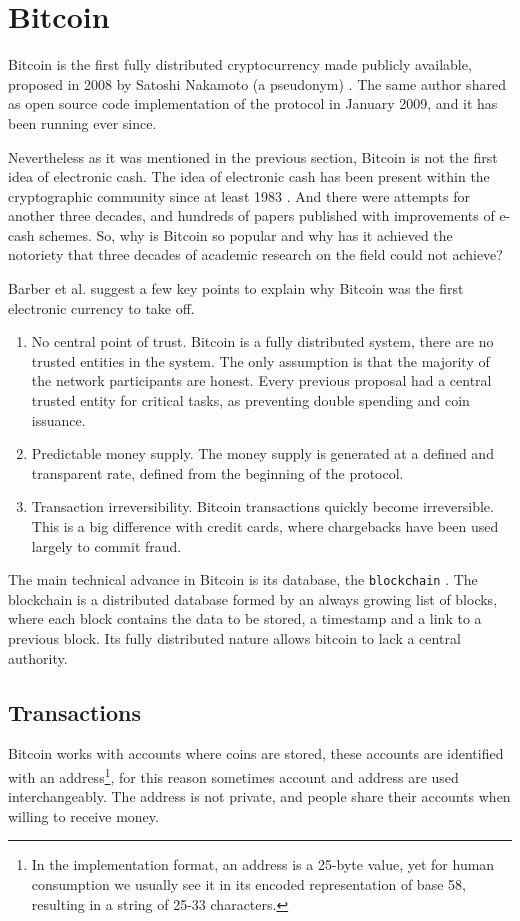 \section{Bitcoin}
Bitcoin is the first fully distributed cryptocurrency made publicly available,
  proposed in 2008 by Satoshi Nakamoto (a pseudonym) \cite{nakamoto2008bitcoin}.
The same author shared as open source code implementation of the protocol in
  January 2009, and it has been running ever since.

Nevertheless as it was mentioned in the previous section, Bitcoin is not the
  first idea of electronic cash.
The idea of electronic cash has been present within the cryptographic community
  since at least 1983 \cite{chaum1983blind}.
And there were attempts for another three decades, and hundreds of papers
  published with improvements of e-cash schemes\cite{barber2012bitter}.
So, why is Bitcoin so popular and why has it achieved the notoriety that three
  decades of academic research on the field could not achieve?

Barber et al. \cite{barber2012bitter} suggest a few key points to explain why
  Bitcoin was the first electronic currency to take off.
\begin{enumerate}
\item No central point of trust.
	Bitcoin is a fully distributed system, there are no trusted entities in the
	  system. The only assumption is that the majority of the network participants
	  are honest. Every previous proposal had a central trusted entity for
	  critical tasks, as preventing double spending and coin issuance.
\item Predictable money supply.
	The money supply is generated at a defined and transparent rate, defined from
	  the beginning of the protocol.
\item Transaction irreversibility.
	Bitcoin transactions quickly become irreversible. This is a big difference
	  with credit cards, where chargebacks have been used largely to commit
	  fraud.
\end{enumerate}

  The main technical advance in Bitcoin is its database, the
  \texttt{blockchain} \cite{inventionblockchain,blockchainmostimportant}.
The blockchain is a distributed database formed by an always growing list of
  blocks, where each block contains the data to be stored, a timestamp and a
  link to a previous block. Its fully distributed nature allows bitcoin to lack
  a central authority.

\subsection{Transactions}\label{subsec:Transaction}
Bitcoin works with accounts where coins are stored, these accounts are
  identified with an address\footnote{In the implementation format, an address
    is a 25-byte value, yet for human consumption we usually see it in its
    encoded representation of base 58, resulting in a string of 25-33
    characters.}, for this reason sometimes account and address are used
    interchangeably.
The address is not private, and people share their accounts when willing to
  receive money.

